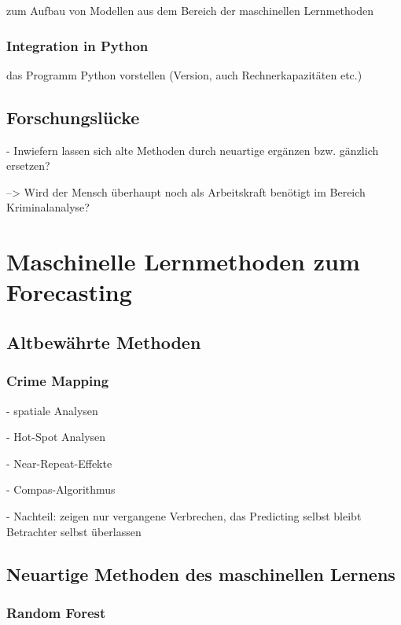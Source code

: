 \documentclass[a4paper,12pt,parskip,bibtotoc,liststotoc]{article}
\begin{document}
zum Aufbau von Modellen aus dem Bereich der maschinellen Lernmethoden\\


\subsubsection{Integration in Python}

das Programm Python vorstellen (Version, auch Rechnerkapazitäten etc.)


\subsection{Forschungslücke} 

- Inwiefern lassen sich alte Methoden durch neuartige ergänzen bzw. gänzlich ersetzen?

--> Wird der Mensch überhaupt noch als Arbeitskraft benötigt im Bereich Kriminalanalyse?





\newpage
\section{Maschinelle Lernmethoden zum Forecasting}

\subsection{Altbewährte Methoden}

\subsubsection{Crime Mapping}

- spatiale Analysen

- Hot-Spot Analysen

- Near-Repeat-Effekte

- Compas-Algorithmus 

- Nachteil: zeigen nur vergangene Verbrechen, das Predicting selbst bleibt Betrachter selbst überlassen

\subsection{Neuartige Methoden des maschinellen Lernens}

\subsubsection{Random Forest}  
\end{document}
